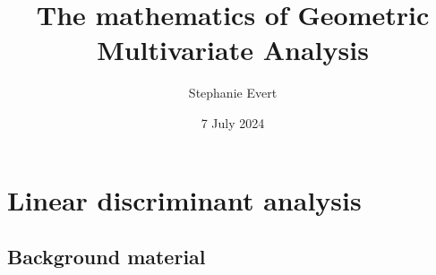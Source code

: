 \documentclass[a4paper]{article}
\title{The mathematics of Geometric Multivariate Analysis}
\author{Stephanie Evert}
\date{7 July 2024}
\begin{document}
\maketitle

\tableofcontents

\section{Linear discriminant analysis}
\label{sec:lda}

\subsection{Background material}
\label{sec:lda:background}
\end{document}
